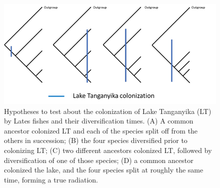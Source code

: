 \begin{figure}[tb]
\includegraphics[width=\textwidth]
{figures/colonization_hypothesis.png}\caption{\label{fig:colonization_hypothesis} Hypotheses to test about the colonization of Lake Tanganyika (LT) by Lates fishes and their diversification times. (A) A common ancestor colonized LT and each of the species split off from the others in succession; (B) the four species diversified prior to colonizing LT; (C) two different ancestors colonized LT, followed by diversification of one of those species; (D) a common ancestor colonized the lake, and the four species split at roughly the same time, forming a true radiation.}
\end{figure}

